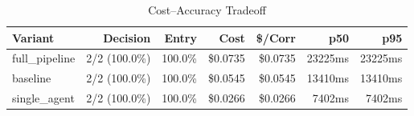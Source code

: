 \begin{table}[htbp]
\centering
\caption{Cost--Accuracy Tradeoff}
\label{tab:cost-accuracy}
\begin{tabular}{l r r rr rr}
\toprule
Variant & Decision & Entry & Cost & \$/Corr & p50 & p95 \\
\midrule
  full\_pipeline & 2/2 (100.0\%) & 100.0\% & \$0.0735 & \$0.0735 & 23225ms & 23225ms \\
  baseline & 2/2 (100.0\%) & 100.0\% & \$0.0545 & \$0.0545 & 13410ms & 13410ms \\
  single\_agent & 2/2 (100.0\%) & 100.0\% & \$0.0266 & \$0.0266 & 7402ms & 7402ms \\
\bottomrule
\end{tabular}
\end{table}
